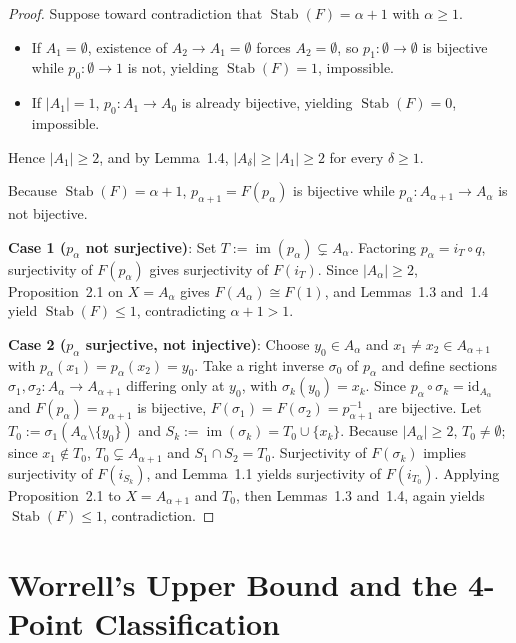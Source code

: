 \documentclass[11pt,a4paper]{article}
\theoremstyle{plain}
\newcommand{\Stab}{\operatorname{Stab}}
\newcommand{\im}{\operatorname{im}}
\newcommand{\id}{\mathrm{id}}
\begin{document}
\begin{proof}
Suppose toward contradiction that $\Stab(F) = \alpha + 1$ with $\alpha \ge 1$.
\begin{itemize}[leftmargin=2em]
  \item If $A_1 = \emptyset$, existence of $A_2 \to A_1 = \emptyset$ forces $A_2 = \emptyset$, so $p_1 : \emptyset \to \emptyset$ is bijective while $p_0 : \emptyset \to 1$ is not, yielding $\Stab(F) = 1$, impossible.
  \item If $|A_1| = 1$, $p_0 : A_1 \to A_0$ is already bijective, yielding $\Stab(F) = 0$, impossible.
\end{itemize}
Hence $|A_1| \ge 2$, and by Lemma~1.4, $|A_\delta| \ge |A_1| \ge 2$ for every $\delta \ge 1$.

Because $\Stab(F) = \alpha + 1$, $p_{\alpha+1} = F(p_\alpha)$ is bijective while $p_\alpha : A_{\alpha+1} \to A_\alpha$ is not bijective.

\textbf{Case 1 ($p_\alpha$ not surjective)}: Set $T := \im(p_\alpha) \subsetneq A_\alpha$. Factoring $p_\alpha = i_T \circ q$, surjectivity of $F(p_\alpha)$ gives surjectivity of $F(i_T)$. Since $|A_\alpha| \ge 2$, Proposition~2.1 on $X = A_\alpha$ gives $F(A_\alpha) \cong F(1)$, and Lemmas~1.3 and~1.4 yield $\Stab(F) \le 1$, contradicting $\alpha + 1 > 1$.

\textbf{Case 2 ($p_\alpha$ surjective, not injective)}: Choose $y_0 \in A_\alpha$ and $x_1 \neq x_2 \in A_{\alpha+1}$ with $p_\alpha(x_1) = p_\alpha(x_2) = y_0$. Take a right inverse $\sigma_0$ of $p_\alpha$ and define sections $\sigma_1, \sigma_2 : A_\alpha \to A_{\alpha+1}$ differing only at $y_0$, with $\sigma_k(y_0) = x_k$. Since $p_\alpha \circ \sigma_k = \id_{A_\alpha}$ and $F(p_\alpha) = p_{\alpha+1}$ is bijective, $F(\sigma_1) = F(\sigma_2) = p_{\alpha+1}^{-1}$ are bijective. Let $T_0 := \sigma_1(A_\alpha \setminus \{y_0\})$ and $S_k := \im(\sigma_k) = T_0 \cup \{x_k\}$. Because $|A_\alpha| \ge 2$, $T_0 \neq \emptyset$; since $x_1 \notin T_0$, $T_0 \subsetneq A_{\alpha+1}$ and $S_1 \cap S_2 = T_0$. Surjectivity of $F(\sigma_k)$ implies surjectivity of $F(i_{S_k})$, and Lemma~1.1 yields surjectivity of $F(i_{T_0})$. Applying Proposition~2.1 to $X = A_{\alpha+1}$ and $T_0$, then Lemmas~1.3 and~1.4, again yields $\Stab(F) \le 1$, contradiction.
\end{proof}

\section{Worrell's Upper Bound and the 4-Point Classification}
\end{document}
